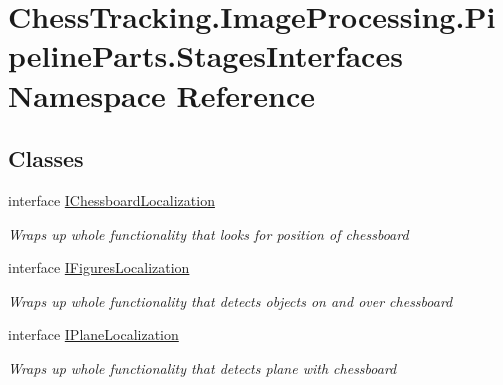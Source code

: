 \hypertarget{namespace_chess_tracking_1_1_image_processing_1_1_pipeline_parts_1_1_stages_interfaces}{}\section{Chess\+Tracking.\+Image\+Processing.\+Pipeline\+Parts.\+Stages\+Interfaces Namespace Reference}
\label{namespace_chess_tracking_1_1_image_processing_1_1_pipeline_parts_1_1_stages_interfaces}
\subsection*{Classes}
\begin{DoxyCompactItemize}
\item 
interface \mbox{\hyperlink{interface_chess_tracking_1_1_image_processing_1_1_pipeline_parts_1_1_stages_interfaces_1_1_i_chessboard_localization}{I\+Chessboard\+Localization}}
\begin{DoxyCompactList}\small\item\em Wraps up whole functionality that looks for position of chessboard \end{DoxyCompactList}\item 
interface \mbox{\hyperlink{interface_chess_tracking_1_1_image_processing_1_1_pipeline_parts_1_1_stages_interfaces_1_1_i_figures_localization}{I\+Figures\+Localization}}
\begin{DoxyCompactList}\small\item\em Wraps up whole functionality that detects objects on and over chessboard \end{DoxyCompactList}\item 
interface \mbox{\hyperlink{interface_chess_tracking_1_1_image_processing_1_1_pipeline_parts_1_1_stages_interfaces_1_1_i_plane_localization}{I\+Plane\+Localization}}
\begin{DoxyCompactList}\small\item\em Wraps up whole functionality that detects plane with chessboard \end{DoxyCompactList}\end{DoxyCompactItemize}
